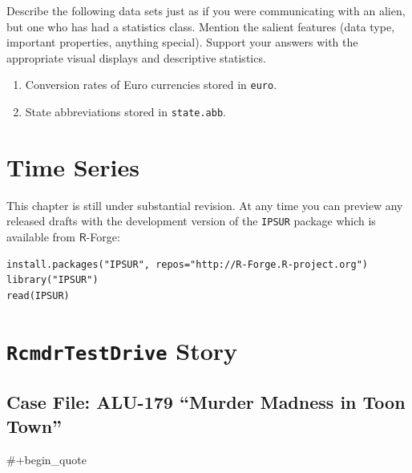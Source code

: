 \documentclass[10pt,english]{scrbook}
\begin{document}
\begin{xca}
Describe the following data sets just as if you were communicating with an alien, but one who has had a statistics class. Mention the salient features (data type, important properties, anything special). Support your answers with the appropriate visual displays and descriptive statistics.
\begin{enumerate}
\item Conversion rates of Euro currencies stored in \texttt{euro}.
\item State abbreviations stored in \texttt{state.abb}.
\end{enumerate}
\end{xca}

\chapter[Time Series]{Time Series}
\label{sec-2}

This chapter is still under substantial revision. At any time you can preview any released drafts with the development version of the \texttt{IPSUR} package which is available from \(\mathsf{R}\)-Forge:

\begin{verbatim}
install.packages("IPSUR", repos="http://R-Forge.R-project.org")
library("IPSUR")
read(IPSUR)
\end{verbatim}

\appendix

\chapter[\texttt{RcmdrTestDrive} Story]{\texttt{RcmdrTestDrive} Story}
\label{sec-3}



\section[Case File: ALU-179 ``Murder Madness in Toon Town”]{Case File: ALU-179 ``Murder Madness in Toon Town”}
\label{sec-3-1}
\#+begin\_quote

\vfill{}

\cleardoublepage
{}
{}

\nocite{*}

\vfill{}
\cleardoublepage
{}
{} 
\printindex{}
\end{document}
